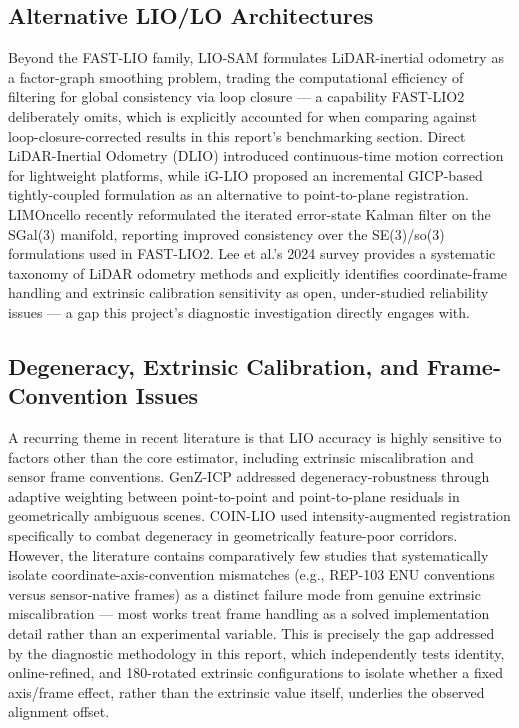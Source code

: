 \documentclass[conference]{IEEEtran}
\begin{document}
\subsection{Alternative LIO/LO Architectures}
Beyond the FAST-LIO family, LIO-SAM \cite{liosam} formulates LiDAR-inertial odometry as a factor-graph smoothing problem, trading the computational efficiency of filtering for global consistency via loop closure --- a capability FAST-LIO2 deliberately omits, which is explicitly accounted for when comparing against loop-closure-corrected results in this report's benchmarking section. Direct LiDAR-Inertial Odometry (DLIO) \cite{dlio} introduced continuous-time motion correction for lightweight platforms, while iG-LIO \cite{iglio} proposed an incremental GICP-based tightly-coupled formulation as an alternative to point-to-plane registration. LIMOncello \cite{limoncello} recently reformulated the iterated error-state Kalman filter on the SGal(3) manifold, reporting improved consistency over the SE(3)/so(3) formulations used in FAST-LIO2. Lee et al.'s 2024 survey \cite{lidarsurvey} provides a systematic taxonomy of LiDAR odometry methods and explicitly identifies coordinate-frame handling and extrinsic calibration sensitivity as open, under-studied reliability issues --- a gap this project's diagnostic investigation directly engages with.

\subsection{Degeneracy, Extrinsic Calibration, and Frame-Convention Issues}
A recurring theme in recent literature is that LIO accuracy is highly sensitive to factors other than the core estimator, including extrinsic miscalibration and sensor frame conventions. GenZ-ICP \cite{genzicp} addressed degeneracy-robustness through adaptive weighting between point-to-point and point-to-plane residuals in geometrically ambiguous scenes. COIN-LIO \cite{coinlio} used intensity-augmented registration specifically to combat degeneracy in geometrically feature-poor corridors. However, the literature contains comparatively few studies that systematically isolate coordinate-axis-convention mismatches (e.g., REP-103 ENU conventions versus sensor-native frames) as a distinct failure mode from genuine extrinsic miscalibration --- most works treat frame handling as a solved implementation detail rather than an experimental variable. This is precisely the gap addressed by the diagnostic methodology in this report, which independently tests identity, online-refined, and 180\textdegree-rotated extrinsic configurations to isolate whether a fixed axis/frame effect, rather than the extrinsic value itself, underlies the observed alignment offset.
\end{document}
